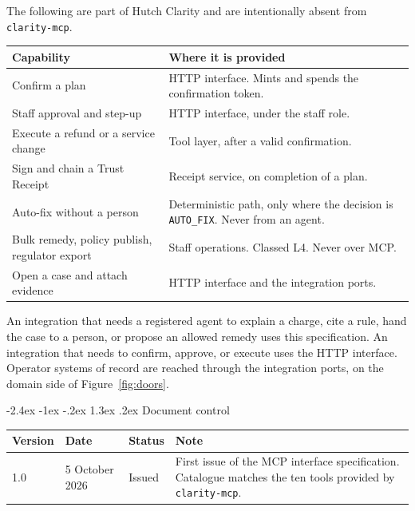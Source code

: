 \documentclass[11pt,a4paper]{article}
\makeatletter
\renewcommand\section{%
  \@startsection{section}{1}{\z@}%
    {-2.4ex \@plus -1ex \@minus -.2ex}%
    {1.3ex \@plus .2ex}%
    {\Large\sffamily\bfseries\color{hcNavy}}%
}
\newcommand{\code}[1]{\texttt{#1}}
\makeatother
\begin{document}
The following are part of Hutch Clarity and are intentionally absent from \code{clarity-mcp}.

\begin{center}
\small
\begin{tabularx}{\textwidth}{@{}lX@{}}
\toprule
\textbf{Capability} & \textbf{Where it is provided} \\
\midrule
Confirm a plan & HTTP interface. Mints and spends the confirmation token. \\
Staff approval and step-up & HTTP interface, under the staff role. \\
Execute a refund or a service change & Tool layer, after a valid confirmation. \\
Sign and chain a Trust Receipt & Receipt service, on completion of a plan. \\
Auto-fix without a person & Deterministic path, only where the decision is \code{AUTO\_FIX}. Never from an agent. \\
Bulk remedy, policy publish, regulator export & Staff operations. Classed L4. Never over MCP. \\
Open a case and attach evidence & HTTP interface and the integration ports. \\
\bottomrule
\end{tabularx}
\end{center}

An integration that needs a registered agent to explain a charge, cite a rule, hand the case to a person, or propose an allowed remedy uses this specification. An integration that needs to confirm, approve, or execute uses the HTTP interface. Operator systems of record are reached through the integration ports, on the domain side of Figure~\ref{fig:doors}.

\section{Document control}

\begin{center}
\small
\begin{tabularx}{\textwidth}{@{}lllX@{}}
\toprule
\textbf{Version} & \textbf{Date} & \textbf{Status} & \textbf{Note} \\
\midrule
1.0 & 5 October 2026 & Issued & First issue of the MCP interface specification. Catalogue matches the ten tools provided by \code{clarity-mcp}. \\
\bottomrule
\end{tabularx}
\end{center}
\end{document}
